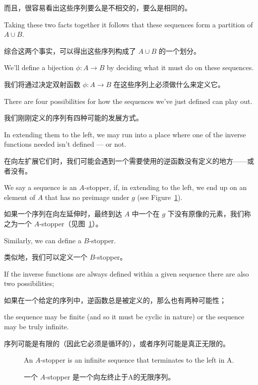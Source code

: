 而且，很容易看出这些序列要么是不相交的，要么是相同的。

Taking these two facts together it follows that these sequences
form a partition of $A \cup B$.

综合这两个事实，可以得出这些序列构成了 $A \cup B$ 的一个划分。

We'll define a bijection
$\phi : A \longrightarrow B$ by deciding what it must do on these
sequences.

我们将通过决定双射函数 $\phi : A \longrightarrow B$ 在这些序列上必须做什么来定义它。

There are four possibilities for how the sequences we've
just defined can play out.

我们刚刚定义的序列有四种可能的发展方式。

In extending them to the left, we may run
into a place where one of the inverse functions needed isn't
defined --- or not.

在向左扩展它们时，我们可能会遇到一个需要使用的逆函数没有定义的地方——或者没有。

We say a sequence is an
$A$-stopper, if, in extending to the left, we end
up on an element of $A$ that has
no preimage under $g$ (see Figure~\ref{fig:A-stopper}).

如果一个序列在向左延伸时，最终到达 $A$ 中一个在 $g$ 下没有原像的元素，我们称之为一个 $A$-stopper（见图~\ref{fig:A-stopper}）。

Similarly,
we can define a $B$-stopper.

类似地，我们可以定义一个 $B$-stopper。

If the inverse functions are always defined within a given sequence there are
also two possibilities;

如果在一个给定的序列中，逆函数总是被定义的，那么也有两种可能性；

the sequence may be finite (and so it must be cyclic in
nature) or the sequence may be truly infinite.

序列可能是有限的（因此它必须是循环的），或者序列可能是真正无限的。

\begin{figure}[!hbtp]
    \begin{center}
        
    \end{center}
    \caption[An \emph{A}-stopper in the proof of C-B-S.]{An $A$-stopper
        is an infinite sequence that terminates to the left in A.}
    \caption[C-B-S证明中的一个\emph{A}-stopper。]{一个 $A$-stopper 是一个向左终止于A的无限序列。}
    \label{fig:A-stopper}
\end{figure}


